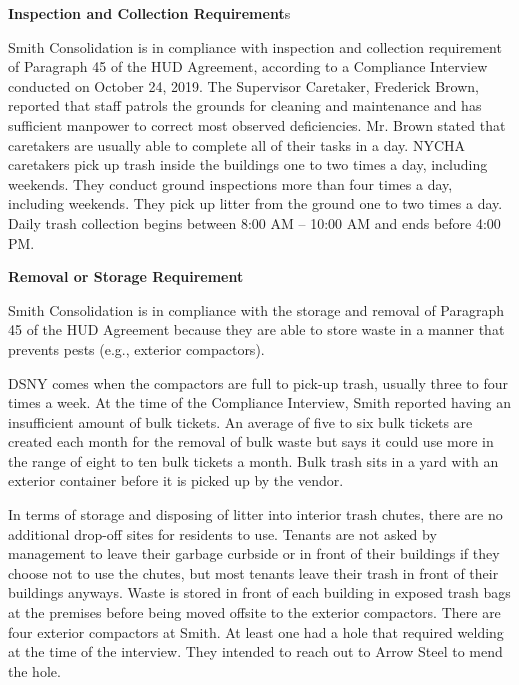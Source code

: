 


\textbf{Inspection and Collection Requirement}s 

Smith Consolidation is in compliance with inspection and collection requirement of Paragraph 45 of the HUD Agreement, according to a Compliance Interview conducted on October 24, 2019. The Supervisor Caretaker, Frederick Brown, reported that staff patrols the grounds for cleaning and maintenance and has sufficient manpower to correct most observed deficiencies. Mr. Brown stated that caretakers are usually able to complete all of their tasks in a day.  NYCHA caretakers pick up trash inside the buildings one to two times a day, including weekends. They conduct ground inspections more than four times a day, including weekends. They pick up litter from the ground one to two times a day. Daily trash collection begins between 8:00 AM -- 10:00 AM and ends before 4:00 PM. 

 

\textbf{Removal or Storage Requirement} 

Smith Consolidation is in compliance with the storage and removal of Paragraph 45 of the HUD Agreement because they are able to store waste in a manner that prevents pests (e.g., exterior compactors). 



DSNY comes when the compactors are full to pick-up trash, usually three to four times a week. At the time of the Compliance Interview, Smith reported having an insufficient amount of bulk tickets. An average of five to six bulk tickets are created each month for the removal of bulk waste but says it could use more in the range of eight to ten bulk tickets a month. Bulk trash sits in a yard with an exterior container before it is picked up by the vendor.  

 

In terms of storage and disposing of litter into interior trash chutes, there are no additional drop-off sites for residents to use. Tenants are not asked by management to leave their garbage curbside or in  front of their buildings if they choose not to use the chutes, but most tenants leave their trash in front of their buildings anyways. Waste is stored in front of each building in exposed trash bags at the premises before being moved offsite to the exterior compactors. There are four exterior compactors at Smith. At least one had a hole that required welding at the time of the interview. They intended to reach out to Arrow Steel to mend the hole.

